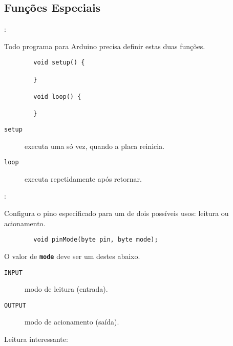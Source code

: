 \subsection{Funções Especiais}


\begin{frame}[fragile]{\insertsection: \insertsubsection}

	Todo programa para Arduino precisa definir estas duas funções.

	\begin{verbatim}
		void setup() {

		}

		void loop() {

		}
	\end{verbatim}

	\begin{description}
		\item[\texttt{setup}] executa uma só vez, quando a placa reinicia.
		\item[\texttt{loop}] executa repetidamente após \texttt{} retornar.
	\end{description}

\end{frame}


\begin{frame}[b,fragile]{\insertsection: \insertsubsection}

	Configura o pino especificado para um de dois possíveis usos: leitura ou acionamento.
	\begin{verbatim}
		void pinMode(byte pin, byte mode);
	\end{verbatim}

	O valor de \texttt{\textbf{mode}} deve ser um destes abaixo.
	\begin{description}
		\item[\texttt{INPUT}] modo de leitura (entrada).
		\item[\texttt{OUTPUT}] modo de acionamento (saída).
	\end{description}

	\vfill
	Leitura interessante: 

\end{frame}


